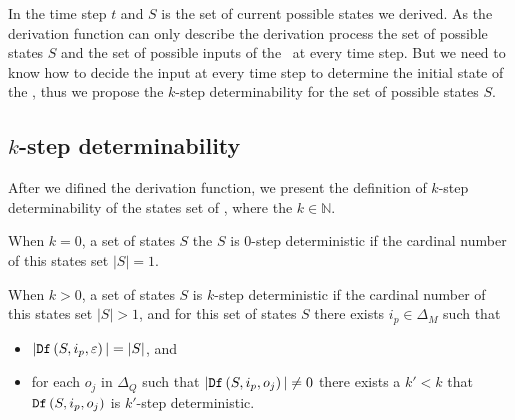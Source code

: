 
 In the time step $t$ and $S$ is the set of current possible states we derived. As the derivation function can only describe the derivation process the set of possible states $S$ and the set of possible inputs of the \BCN\ at every time step. But we need to know how to decide the input at every time step to determine the initial state of the \BCN, thus we propose the $k$-step determinability for the set of possible states $S$.
\subsection{$k$-step determinability}
After we difined the derivation function, we present the definition of $k$-step determinability of the states set of \BCNs, where the $k\in \mathbb{N}$.%
\begin{definition} 

When $k=0$, a set of states $S$ the $S$ is $0$-step deterministic if the cardinal number of this states set $|S|=1$. 

When $k>0$, a set of states $S$ is $k$-step deterministic
 if the cardinal number of this states set $|S|>1$, and for this set of states $S$ there exists $i_p \in \Delta_M$ such that
 \begin{itemize}
 \item  $|{\tt Df}\left(S,i_p,\varepsilon\right)|=|S|$, and 
 \item  for each $o_j$ in $\Delta_Q$ such that $|{\tt Df}\left(S,i_p,o_j\right)|\neq 0$ there exists a ${k'}<k$ that ${\tt Df}\left(S,i_p,o_j\right)$ is $k'$-step deterministic.
 \end{itemize}
\end{definition}

